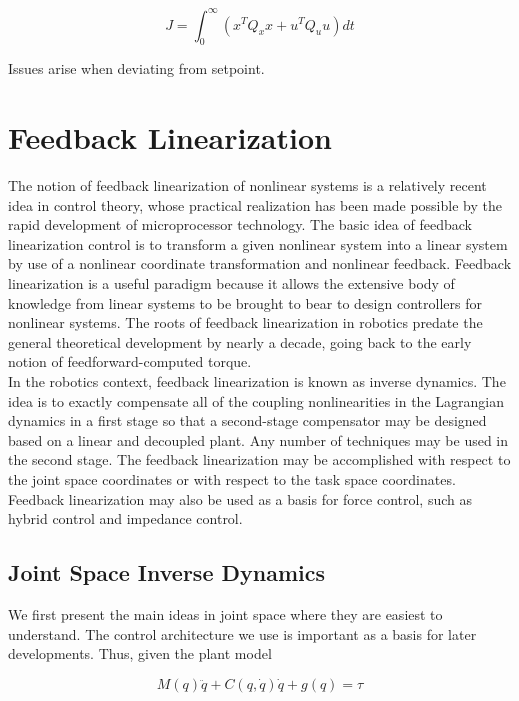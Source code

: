 \documentclass{UoNMCHA}
\numberwithin{equation}{section}
\begin{document}
\begin{equation}
J=\int_{0}^{\infty}(x^T Q_x x+u^T Q_u u)d t
\end{equation}

Issues arise when deviating from setpoint.

\section{Feedback Linearization}

The notion of feedback linearization of nonlinear systems is a relatively recent idea in control theory, whose practical realization has been made possible by the rapid development of microprocessor technology. The basic idea of feedback linearization control is to transform a given nonlinear system into a linear system by use of a nonlinear coordinate transformation and nonlinear   feedback. Feedback linearization is a useful paradigm because it allows the extensive body of knowledge from linear systems to be brought to bear to design controllers for nonlinear systems. The roots of feedback linearization in robotics predate the general theoretical development by nearly a decade, going back to the early notion of feedforward-computed torque. \\

In the robotics context, feedback linearization is known as inverse dynamics. The idea is to exactly compensate all of the coupling nonlinearities in the Lagrangian dynamics in a first stage so that a second-stage compensator may be designed based on a linear and decoupled plant. Any number of techniques may be used in the second stage. The feedback linearization may be   accomplished with respect to the joint space coordinates or with respect to the task space coordinates. Feedback linearization may also be used as a basis for force control, such as hybrid control and impedance control. 

\subsection{Joint Space Inverse Dynamics}


We first present the main ideas in joint space where they are easiest to understand. The control architecture we use is important as a basis for later developments. Thus, given the plant model

\begin{equation}\label{syseq}
M(q)\ddot{q}+C(q,\dot{q})\dot{q}+g(q)=\tau
\end{equation}
\end{document}
